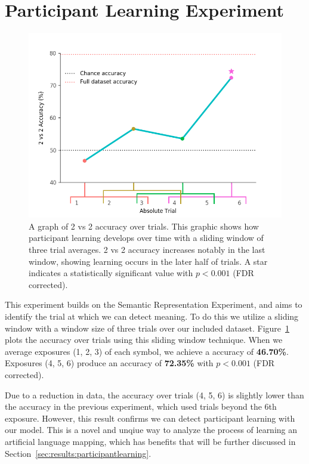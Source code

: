 \section{Participant Learning Experiment}

\begin{figure}[t]
  \centering
  \includegraphics[width=0.75\linewidth]{figures/learning}
  \caption[\tvt Accuracy over Trials]{
    A graph of 2 vs 2 accuracy over trials. This graphic shows how participant 
    learning develops over time with a sliding window of three trial averages.  
    2 vs 2 accuracy increases notably in the last window, showing learning 
    occurs in the later half of trials. A star indicates a statistically 
    significant value with $p < 0.001$ (FDR corrected).
  }
  \label{fig:learning}
\end{figure}

This experiment builds on the Semantic Representation Experiment, and aims to 
identify the trial at which we can detect meaning. To do this we utilize a 
sliding window with a window size of three trials over our included dataset.   
Figure~\ref{fig:learning} plots the \tvt accuracy over trials using this 
sliding window technique. When we average exposures (1, 2, 3) of each symbol, 
we achieve a \tvt accuracy of \textbf{46.70\%}. Exposures (4, 5, 6) produce an 
accuracy of \textbf{72.35\%} with $p < 0.001$ (FDR corrected). 

Due to a reduction in data, the \tvt accuracy over trials (4, 5, 6) is slightly 
lower than the \tvt accuracy in the previous experiment, which used trials 
beyond the 6th exposure. However, this result confirms we can detect 
participant learning with our model. This is a novel and unqiue way to analyze 
the process of learning an artificial language mapping, which has benefits that 
will be further discussed in Section~\ref{sec:results:participantlearning}.
